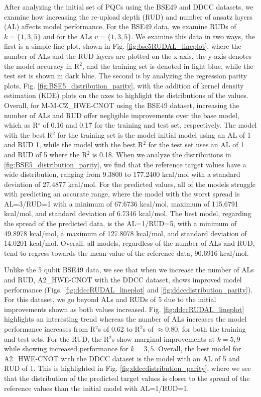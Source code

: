 \documentclass[journal=jacsat,manuscript=article]{achemso}
\begin{document}
After analyzing the initial set of PQCs using the BSE49 and DDCC datasets, we examine how increasing the re-upload depth (RUD) and number of ansatz layers (AL) affects model performance.
For the BSE49 data, we examine RUDs of $k=\{1,3,5\}$ and for the ALs $v=\{1,3,5\}$.
We examine this data in two ways, the first is a simple line plot, shown in Fig. \ref{fig:bse5RUDAL_lineplot}, where the number of ALs and the RUD layers are plotted on the x-axis, the y-axis denotes the model accuracy in R$^{2}$, and the training set is denoted in light blue, while the test set is shown in dark blue.
The second is by analyzing the regression parity plots, Fig. \ref{fig:BSE5_distribution_parity}, with the addition of kernel density estimation (KDE) plots on the axes to highlight the distributions of the values.
Overall, for M-M-CZ{\_}HWE-CNOT using the BSE49 dataset, increasing the number of ALs and RUD offer negligible improvements over the base model, which as R$^{s}$ of 0.16 and 0.17 for the training and test set, respectively.
The model with the best R$^{2}$ for the training set is the model initial model using an AL of 1 and RUD 1, while the model with the best R$^{2}$ for the test set uses an AL of 1 and RUD of 5 where the R$^{2}$ is 0.18.
When we analyze the distributions in \ref{fig:BSE5_distribution_parity}, we find that the reference target values have a wide distribution, ranging from 9.3800 to 177.2400 kcal/mol with a standard deviation of 27.4877 kcal/mol.
For the predicted values, all of the models struggle with predicting an accurate range, where the model with the worst spread is AL=3/RUD=1 with a minimum of 67.6736 kcal/mol, maximum of 115.6791 kcal/mol, and standard deviation of 6.7346 kcal/mol.
The best model, regarding the spread of the predicted data, is the AL=1/RUD=5, with a minimum of 49.8978 kcal/mol, a maximum of 127.8078 kcal/mol, and standard deviation of 14.0201 kcal/mol. 
Overall, all models, regardless of the number of ALs and RUD, tend to regress towards the mean value of the reference data, 90.6916 kcal/mol.

Unlike the 5 qubit BSE49 data, we see that when we increase the number of ALs and RUD, A2{\_}HWE-CNOT with the DDCC dataset, shows improved model performance (Figs. \ref{fig:ddccRUDAL_lineplot} and \ref{fig:ddccdistribution_parity}).
For this dataset, we go beyond ALs and RUDs of 5 due to the initial improvements shown as both values increased.
Fig. \ref{fig:ddccRUDAL_lineplot} highlights an interesting trend whereas the number of ALs increases the model performance increases from R$^{2}$s of 0.62 to R$^{2}$s of $\approx 0.80$, for both the training and test sets.
For the RUD, the R$^{2}$s show marginal improvements at $k=5,9$ while showing increased performance for $k=3,5$. 
Overall, the best model for A2{\_}HWE-CNOT with the DDCC dataset is the model with an AL of 5 and RUD of 1.
This is highlighted in Fig. \ref{fig:ddccdistribution_parity}, where we see that the distribution of the predicted target values is closer to the spread of the reference values than the initial model with AL=1/RUD=1.
\end{document}
